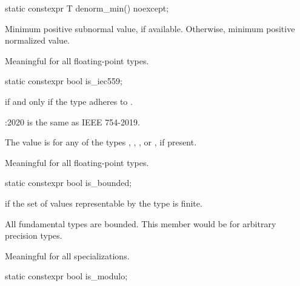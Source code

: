 %
\begin{itemdecl}
static constexpr T denorm_min() noexcept;
\end{itemdecl}

\begin{itemdescr}
%
\pnum
Minimum positive subnormal value, if available.
Otherwise, minimum positive normalized value.

\pnum
Meaningful for all floating-point types.
\end{itemdescr}

%
\begin{itemdecl}
static constexpr bool is_iec559;
\end{itemdecl}

\begin{itemdescr}
\pnum
{} if and only if the type adheres to \IsoFloatUndated{}.
\begin{footnote}
\IsoFloatUndated{}:2020 is the same as IEEE 754-2019.
\end{footnote}
\begin{note}
The value is  for any of the types
, , , or ,
if present.
\end{note}

\pnum
Meaningful for all floating-point types.
\end{itemdescr}

%
\begin{itemdecl}
static constexpr bool is_bounded;
\end{itemdecl}

\begin{itemdescr}
\pnum
{} if the set of values representable by the type is finite.
\begin{note}
All fundamental types are bounded. This member would be  for arbitrary
precision types.
\end{note}

\pnum
Meaningful for all specializations.
\end{itemdescr}

%
\begin{itemdecl}
static constexpr bool is_modulo;
\end{itemdecl}

